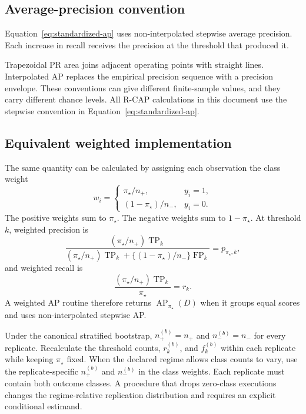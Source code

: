 \documentclass[11pt]{article}
\newcommand{\AP}{\operatorname{AP}}
\theoremstyle{remark}
\begin{document}
\subsection{Average-precision convention}

Equation~\eqref{eq:standardized-ap} uses non-interpolated stepwise average precision. Each increase in recall receives the precision at the threshold that produced it.

Trapezoidal PR area joins adjacent operating points with straight lines. Interpolated AP replaces the empirical precision sequence with a precision envelope. These conventions can give different finite-sample values, and they carry different chance levels. All R-CAP calculations in this document use the stepwise convention in Equation~\eqref{eq:standardized-ap}.

\subsection{Equivalent weighted implementation}

The same quantity can be calculated by assigning each observation the class weight
\begin{equation}
w_i
=
\begin{cases}
\pi_\star/n_+, & y_i=1,\\[4pt]
(1-\pi_\star)/n_-, & y_i=0.
\end{cases}
\label{eq:reference-weights}
\end{equation}
The positive weights sum to $\pi_\star$. The negative weights sum to $1-\pi_\star$. At threshold $k$, weighted precision is
\[
\frac{(\pi_\star/n_+)\operatorname{TP}_k}
{(\pi_\star/n_+)\operatorname{TP}_k
+
\{(1-\pi_\star)/n_-\}\operatorname{FP}_k}
=
p_{\pi_\star,k},
\]
and weighted recall is
\[
\frac{(\pi_\star/n_+)\operatorname{TP}_k}{\pi_\star}
=
r_k.
\]
A weighted AP routine therefore returns $\AP_{\pi_\star}(D)$ when it groups equal scores and uses non-interpolated stepwise AP.

Under the canonical stratified bootstrap, $n_+^{(b)}=n_+$ and $n_-^{(b)}=n_-$ for every replicate. Recalculate the threshold counts, $r_k^{(b)}$, and $f_k^{(b)}$ within each replicate while keeping $\pi_\star$ fixed. When the declared regime allows class counts to vary, use the replicate-specific $n_+^{(b)}$ and $n_-^{(b)}$ in the class weights. Each replicate must contain both outcome classes. A procedure that drops zero-class executions changes the regime-relative replication distribution and requires an explicit conditional estimand.
\end{document}
